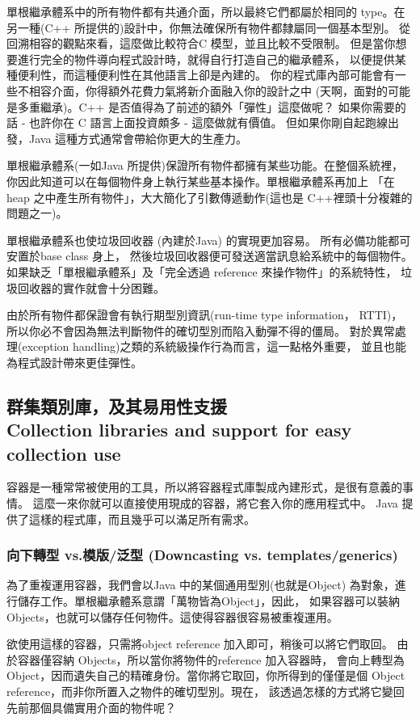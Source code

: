 單根繼承體系中的所有物件都有共通介面，所以最終它們都屬於相同的
type。在另一種(C++ 所提供的)設計中，你無法確保所有物件都隸屬同一個基本型別。
從回溯相容的觀點來看，這麼做比較符合C 模型，並且比較不受限制。
但是當你想要進行完全的物件導向程式設計時，就得自行打造自己的繼承體系，
以便提供某種便利性，而這種便利性在其他語言上卻是內建的。
你的程式庫內部可能會有一些不相容介面，你得額外花費力氣將新介面融入你的設計之中
(天啊，面對的可能是多重繼承)。C++ 是否值得為了前述的額外「彈性」這麼做呢？
如果你需要的話 - 也許你在 C 語言上面投資頗多 - 這麼做就有價值。
但如果你剛自起跑線出發，Java 這種方式通常會帶給你更大的生產力。

單根繼承體系(一如Java 所提供)保證所有物件都擁有某些功能。在整個系統裡，
你因此知道可以在每個物件身上執行某些基本操作。單根繼承體系再加上
「在heap 之中產生所有物件」，大大簡化了引數傳遞動作(這也是
C++裡頭十分複雜的問題之一)。

單根繼承體系也使垃圾回收器 (內建於Java) 的實現更加容易。
所有必備功能都可安置於base class 身上，
然後垃圾回收器便可發送適當訊息給系統中的每個物件。
如果缺乏「單根繼承體系」及「完全透過 reference 來操作物件」的系統特性，
垃圾回收器的實作就會十分困難。

由於所有物件都保證會有執行期型別資訊(run-time type information，
RTTI)，所以你必不會因為無法判斷物件的確切型別而陷入動彈不得的僵局。
對於異常處理(exception handling)之類的系統級操作行為而言，這一點格外重要，
並且也能為程式設計帶來更佳彈性。
\subsection[群集類別庫，及其易用性支援]{群集類別庫，及其易用性支援 \\
Collection libraries and support for easy collection use}
容器是一種常常被使用的工具，所以將容器程式庫製成內建形式，是很有意義的事情。
這麼一來你就可以直接使用現成的容器，將它套入你的應用程式中。
Java 提供了這樣的程式庫，而且幾乎可以滿足所有需求。
\subsubsection{向下轉型 vs.模版/泛型 (Downcasting vs. templates/generics)}
為了重複運用容器，我們會以Java 中的某個通用型別(也就是Object)
為對象，進行儲存工作。單根繼承體系意謂「萬物皆為Object」，因此，
如果容器可以裝納 Objects，也就可以儲存任何物件。這使得容器很容易被重複運用。

欲使用這樣的容器，只需將object reference 加入即可，稍後可以將它們取回。
由於容器僅容納 Objects，所以當你將物件的reference 加入容器時，
會向上轉型為 Object，因而遺失自己的精確身份。當你將它取回，你所得到的僅僅是個
Object reference，而非你所置入之物件的確切型別。現在，
該透過怎樣的方式將它變回先前那個具備實用介面的物件呢？

